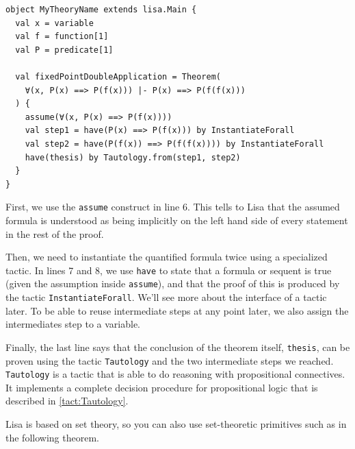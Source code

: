 \noindent
\begin{minipage}{\linewidth}\vspace{1em}
\begin{lstlisting}[language=lisa, frame=single]
object MyTheoryName extends lisa.Main {
  val x = variable
  val f = function[1]
  val P = predicate[1]

  val fixedPointDoubleApplication = Theorem(
    ∀(x, P(x) ==> P(f(x))) |- P(x) ==> P(f(f(x)))
  ) {
    assume(∀(x, P(x) ==> P(f(x))))
    val step1 = have(P(x) ==> P(f(x))) by InstantiateForall
    val step2 = have(P(f(x)) ==> P(f(f(x)))) by InstantiateForall
    have(thesis) by Tautology.from(step1, step2)
  }
}
\end{lstlisting}
\end{minipage}
First, we use the \lstinline|assume| construct in line 6.
This tells to Lisa that the assumed formula is understood as being implicitly on the left hand side of every statement in the rest of the proof.

Then, we need to instantiate the quantified formula twice using a specialized tactic. In lines 7 and 8, we use \lstinline|have| to state that a formula or sequent is true (given the assumption inside \lstinline|assume|), and that the proof of this is produced by the tactic \lstinline|InstantiateForall|.
We'll see more about the interface of a tactic later. To be able to reuse intermediate steps at any point later, we also assign the intermediates step to a variable.

Finally, the last line says that the conclusion of the theorem itself, \lstinline|thesis|, can be proven using the tactic \lstinline|Tautology| and the two intermediate steps we reached. \lstinline|Tautology| is a tactic that is able to do reasoning with propositional connectives. It implements a complete decision procedure for propositional logic that is described in \autoref{tact:Tautology}.

Lisa is based on set theory, so you can also use set-theoretic primitives such as in the following theorem.

